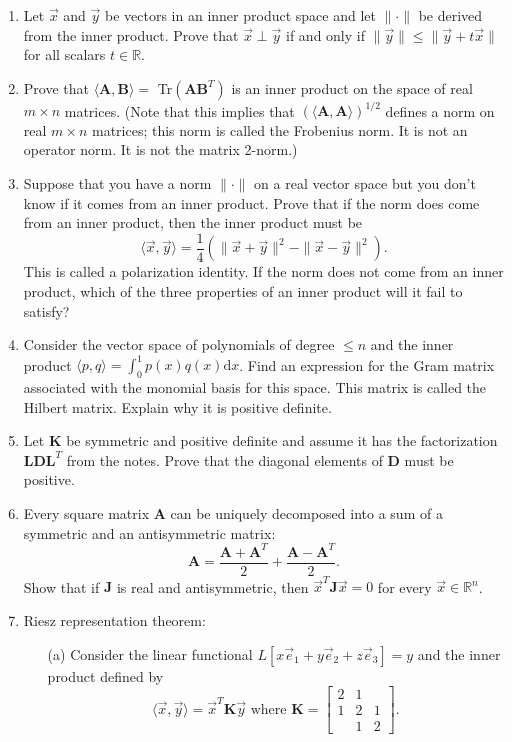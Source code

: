 \documentclass[11pt,fleqn]{article}
\begin{document}
\begin{enumerate}
\item Let $\vec{x}$ and $\vec{y}$ be vectors in an inner product space and let $\|\cdot\|$ be derived from the inner product. Prove that $\vec{x}\perp\vec{y}$ if and only if $\|\vec{y}\|\le\|\vec{y}+t\vec{x}\|$ for all scalars $t\in\mathbb{R}$.
\item Prove that $\langle\mathbf{A},\mathbf{B}\rangle=$ Tr$\left(\mathbf{AB}^T\right)$ is an inner product on the space of real $m\times n$ matrices. (Note that this implies that $(\langle\mathbf{A},\mathbf{A}\rangle)^{1/2}$ defines a norm on real $m\times n$ matrices; this norm is called the Frobenius norm. It is not an operator norm. It is not the matrix 2-norm.)
\item Suppose that you have a norm $\|\cdot\|$ on a real vector space but you don't know if it comes from an inner product.
Prove that if the norm does come from an inner product, then the inner product must be
	\[\langle\vec{x},\vec{y}\rangle = \frac{1}{4}\left(\|\vec{x}+\vec{y}\|^2-\|\vec{x}-\vec{y}\|^2\right).\] This is called a polarization identity. If the norm does not come from an inner product, which of the three properties of an inner product will it fail to satisfy?
\item Consider the vector space of polynomials of degree $\le n$ and the inner product $\langle p,q\rangle = \int_0^1 p(x)q(x)\mathrm{d}x$. Find an expression for the Gram matrix associated with the monomial basis for this space. This matrix is called the Hilbert matrix. Explain why it is positive definite.
\item Let $\mathbf{K}$ be symmetric and positive definite and assume it has the factorization $\mathbf{LDL}^T$ from the notes. Prove that the diagonal elements of $\mathbf{D}$ must be positive.
\item Every square matrix $\mathbf{A}$ can be uniquely decomposed into a sum of a symmetric and an antisymmetric matrix:
\[\mathbf{A} = \frac{\mathbf{A}+\mathbf{A}^T}{2} + \frac{\mathbf{A} - \mathbf{A}^T}{2}.\]
Show that if $\mathbf{J}$ is real and antisymmetric, then $\vec{x}^T\mathbf{J}\vec{x} = 0$ for every $\vec{x}\in\mathbb{R}^n$.
\item Riesz representation theorem:
	\begin{itemize}
	\item[(a)] Consider the linear functional $L[x\vec{e}_1+y\vec{e}_2+z\vec{e}_3] = y$ and the inner product defined by
	\[\langle\vec{x},\vec{y}\rangle = \vec{x}^T\mathbf{K}\vec{y}\text{ where }\mathbf{K} = \left[\begin{array}{ccc}2&1&\\1&2&1\\&1&2\end{array}\right].\]

\end{itemize}
\end{enumerate}
\end{document}
